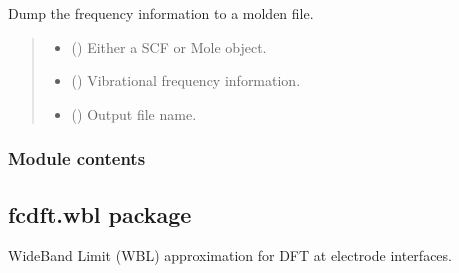 \documentclass[letterpaper,10pt,english]{sphinxmanual}
\begin{document}
\begin{fulllineitems}
\label{\detokenize{fcdft.tools:fcdft.tools.molden.dump_freq}}
\pysigstartsignatures
\pysiglinewithargsret
{}
{\sphinxparamcomma {}\sphinxparamcomma {}}
{}
\pysigstopsignatures
\sphinxAtStartPar
Dump the frequency information to a molden file.
\begin{quote}\begin{description}
\begin{itemize}
\item {} 
\sphinxAtStartPar
{} () \textendash{} Either a SCF or Mole object.

\item {} 
\sphinxAtStartPar
{} () \textendash{} Vibrational frequency information.

\item {} 
\sphinxAtStartPar
{} () \textendash{} Output file name.

\end{itemize}

\end{description}\end{quote}

\end{fulllineitems}



\subsubsection{Module contents}
\label{\detokenize{fcdft.tools:module-fcdft.tools}}\label{\detokenize{fcdft.tools:module-contents}}
\sphinxstepscope


\subsection{fcdft.wbl package}
\label{\detokenize{fcdft.wbl:fcdft-wbl-package}}\label{\detokenize{fcdft.wbl::doc}}
\sphinxAtStartPar
Wide\sphinxhyphen{}Band Limit (WBL) approximation for DFT at electrode interfaces.
\end{document}
